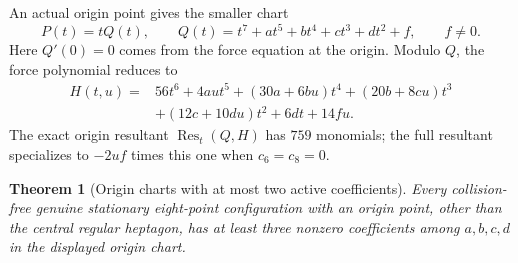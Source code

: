 \documentclass[11pt]{article}
\newtheorem{theorem}{Theorem}[section]
\theoremstyle{remark}
\numberwithin{equation}{section}
\begin{document}
An actual origin point gives the smaller chart
\[
 P(t)=tQ(t),\qquad
 Q(t)=t^7+at^5+bt^4+ct^3+dt^2+f,\qquad f\ne0.
\]
Here $Q'(0)=0$ comes from the force equation at the origin.
Modulo $Q$, the force polynomial reduces to
\begin{align*}
 H(t,u)={}&56t^6+4aut^5+(30a+6bu)t^4
 +(20b+8cu)t^3\\
 &+(12c+10du)t^2+6dt+14fu.
\end{align*}
The exact origin resultant $\operatorname{Res}_t(Q,H)$ has
$759$ monomials; the full resultant specializes to $-2uf$ times
this one when $c_6=c_8=0$.

\begin{theorem}[Origin charts with at most two active coefficients]
\label{thm:eight-origin-two-coefficient-exclusion}
Every collision-free genuine stationary eight-point configuration
with an origin point, other than the central regular heptagon, has
at least three nonzero coefficients among $a,b,c,d$ in the displayed
origin chart.
\end{theorem}
\end{document}
